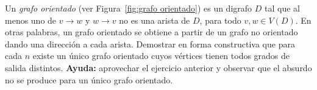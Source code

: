 
\item\Obligatorio Un \emph{grafo orientado} (ver Figura~\ref{fig:grafo orientado}) es un digrafo $D$ tal que al menos uno de $v \to w$ y $w \to v$ no es una arista de $D$, para todo $v,w \in V(D)$.  En otras palabras, un grafo orientado se obtiene a partir de un grafo no orientado dando una dirección a cada arista.  Demostrar en forma constructiva que para cada $n$ existe un único grafo orientado cuyos vértices tienen todos grados de salida distintos.  \textbf{Ayuda:} aprovechar el ejercicio anterior y observar que el absurdo no se produce para un único grafo orientado.

